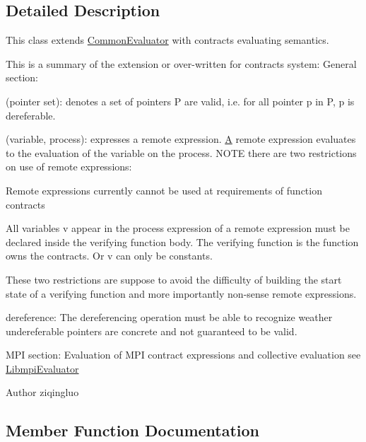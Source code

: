 \subsection{Detailed Description}
This class extends \hyperlink{classedu_1_1udel_1_1cis_1_1vsl_1_1civl_1_1semantics_1_1common_1_1CommonEvaluator_a8746c4deea2a861efa0f60966058858b}{Common\+Evaluator} with contracts evaluating semantics. 

This is a summary of the extension or over-\/written for contracts system\+: General section\+: 
\begin{DoxyEnumerate}
\item (pointer set)\+: denotes a set of pointers P are valid, i.\+e. for all pointer p in P, p is dereferable. 
\item (variable, process)\+: expresses a remote expression. \hyperlink{structA}{A} remote expression evaluates to the evaluation of the variable on the process. N\+O\+T\+E there are two restrictions on use of remote expressions\+: 
\begin{DoxyItemize}
\item Remote expressions currently cannot be used at requirements of function contracts 
\item All variables v appear in the process expression of a remote expression must be declared inside the verifying function body. The verifying function is the function owns the contracts. Or v can only be constants. 
\end{DoxyItemize}These two restrictions are suppose to avoid the difficulty of building the start state of a verifying function and more importantly non-\/sense remote expressions. 
\item dereference\+: The dereferencing operation must be able to recognize weather undereferable pointers are concrete and not guaranteed to be valid. 
\end{DoxyEnumerate}

M\+P\+I section\+: Evaluation of M\+P\+I contract expressions and collective evaluation see \hyperlink{}{Libmpi\+Evaluator} 

\begin{DoxyAuthor}{Author}
ziqingluo 
\end{DoxyAuthor}


\subsection{Member Function Documentation}
\hypertarget{classedu_1_1udel_1_1cis_1_1vsl_1_1civl_1_1semantics_1_1contract_1_1ContractEvaluator_a086f6d930c9d3aa968b31b810f65b7ac}{}
